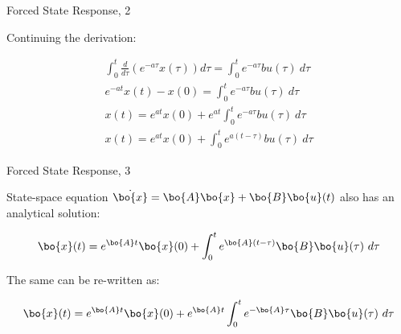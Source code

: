 \documentclass{beamer}
\begin{document}
\begin{frame}{Forced State Response, 2}
	\begin{flushleft}
		
		Continuing the derivation:
		
		\begin{align}
			\int_{0}^{t} \frac{d}{d\tau} \left( e^{-a\tau} x(\tau) \right) d\tau = 	\int_{0}^{t}  e^{-a\tau} bu(\tau) \ d\tau
			\\
			e^{-at} x(t) - x(0) = \int_{0}^{t}  e^{-a\tau} bu(\tau) \ d\tau
			\\
			x(t) = e^{at} x(0) + e^{at} \int_{0}^{t}  e^{-a\tau} bu(\tau) \ d\tau
			\\
			x(t) = e^{at} x(0) + \int_{0}^{t}  e^{a(t-\tau)} bu(\tau) \ d\tau
		\end{align}
		
		
		
	\end{flushleft}
\end{frame}




\begin{frame}{Forced State Response, 3}
	\begin{flushleft}
		
		State-space equation $\dot{\bo{x}} = \bo{A}  \bo{x} + \bo{B}  \bo{u}(t)$ also has an analytical solution:
		
		\begin{equation}
			\bo{x}(t) = e^{\bo{A}t}  \bo{x}(0) + 
			\int_{0}^{t} e^{\bo{A}(t-\tau)} \bo{B}  \bo{u}(\tau) \ d\tau
		\end{equation}
		
		The same can be re-written as:
		
		\begin{equation}
			\bo{x}(t) = e^{\bo{A}t}  \bo{x}(0) + 
			e^{\bo{A}t} \int_{0}^{t} e^{-\bo{A}\tau} \bo{B}  \bo{u}(\tau) \ d\tau
		\end{equation}
		
	\end{flushleft}
\end{frame}






\begin{frame}
	
	
\end{frame}
\end{document}
